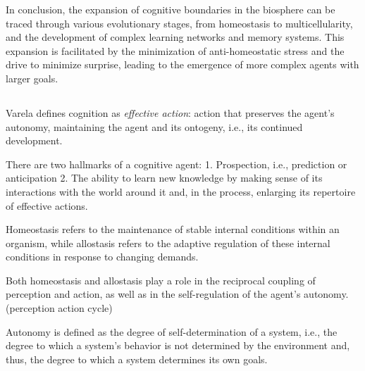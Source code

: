 In conclusion, the expansion of cognitive boundaries in the biosphere can be traced through various evolutionary stages, from homeostasis to multicellularity, and the development of complex learning networks and memory systems. This expansion is facilitated by the minimization of anti-homeostatic stress and the drive to minimize surprise, leading to the emergence of more complex agents with larger goals.





















\subsection{}

\cite{vernon_embodied_2015}
Varela defines cognition as \textit{effective action}: action that preserves the agent's autonomy, maintaining the agent and its ontogeny, i.e., its continued development.

There are two hallmarks of a cognitive agent:
1. Prospection, i.e., prediction or anticipation
2. The ability to learn new knowledge by making sense of its interactions with the world around it and, in the process, enlarging its repertoire of effective actions.

Homeostasis refers to the maintenance of stable internal conditions within an organism, while allostasis refers to the adaptive regulation of these internal conditions in response to changing demands.

Both homeostasis and allostasis play a role in the reciprocal coupling of perception and action, as well as in the self-regulation of the agent's autonomy. (\gls{perception action cycle})

Autonomy is defined as the degree of self-determination of a system, i.e., the degree to which a system's behavior is not determined by the environment and, thus, the degree to which a system determines its own goals. 


